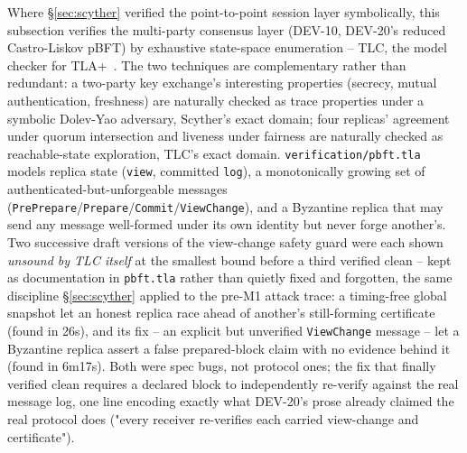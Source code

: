 \documentclass[conference]{IEEEtran}
\begin{document}
Where \S\ref{sec:scyther} verified the point-to-point session layer symbolically, this subsection
verifies the multi-party consensus layer (DEV-10, DEV-20's reduced Castro-Liskov pBFT) by
exhaustive state-space enumeration -- TLC, the model checker for TLA+~\cite{lamport2002specifying}.
The two techniques are complementary rather than redundant: a two-party key exchange's interesting
properties (secrecy, mutual authentication, freshness) are naturally checked as trace properties
under a symbolic Dolev-Yao adversary, Scyther's exact domain; four replicas' agreement under
quorum intersection and liveness under fairness are naturally checked as reachable-state
exploration, TLC's exact domain. \texttt{verification/pbft.tla} models replica state (\texttt{view},
committed \texttt{log}), a monotonically growing set of authenticated-but-unforgeable messages
(\texttt{PrePrepare}/\texttt{Prepare}/\texttt{Commit}/\texttt{ViewChange}), and a Byzantine replica
that may send any message well-formed under its own identity but never forge another's. Two
successive draft versions of the view-change safety guard were each shown \emph{unsound by TLC
itself} at the smallest bound before a third verified clean -- kept as documentation in
\texttt{pbft.tla} rather than quietly fixed and forgotten, the same discipline \S\ref{sec:scyther}
applied to the pre-M1 attack trace: a timing-free global snapshot let an honest replica race ahead
of another's still-forming certificate (found in 26s), and its fix -- an explicit but unverified
\texttt{ViewChange} message -- let a Byzantine replica assert a false prepared-block claim with no
evidence behind it (found in 6m17s). Both were spec bugs, not protocol ones; the fix that finally
verified clean requires a declared block to independently re-verify against the real message log,
one line encoding exactly what DEV-20's prose already claimed the real protocol does ("every
receiver re-verifies each carried view-change and certificate").
\end{document}
